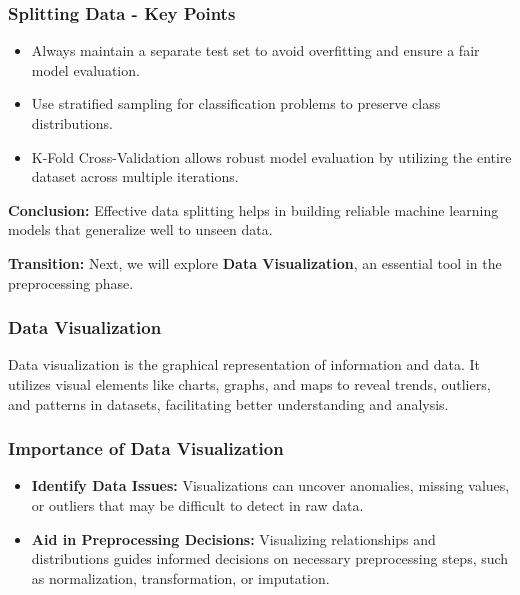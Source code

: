 \documentclass[aspectratio=169]{beamer}
\begin{document}
\begin{frame}[fragile]
    \frametitle{Splitting Data - Key Points}
    \begin{itemize}
        \item Always maintain a separate test set to avoid overfitting and ensure a fair model evaluation.
        \item Use stratified sampling for classification problems to preserve class distributions.
        \item K-Fold Cross-Validation allows robust model evaluation by utilizing the entire dataset across multiple iterations.
    \end{itemize}
    
    \textbf{Conclusion:} Effective data splitting helps in building reliable machine learning models that generalize well to unseen data.
    
    \textbf{Transition:} Next, we will explore \textbf{Data Visualization}, an essential tool in the preprocessing phase.
\end{frame}

\begin{frame}[fragile]
    \frametitle{Data Visualization}
    Data visualization is the graphical representation of information and data. It utilizes visual elements like charts, graphs, and maps to reveal trends, outliers, and patterns in datasets, facilitating better understanding and analysis.
\end{frame}

\begin{frame}[fragile]
    \frametitle{Importance of Data Visualization}
    \begin{itemize}
        \item \textbf{Identify Data Issues:} Visualizations can uncover anomalies, missing values, or outliers that may be difficult to detect in raw data.
        \item \textbf{Aid in Preprocessing Decisions:} Visualizing relationships and distributions guides informed decisions on necessary preprocessing steps, such as normalization, transformation, or imputation.
    \end{itemize}
\end{frame}
\end{document}
